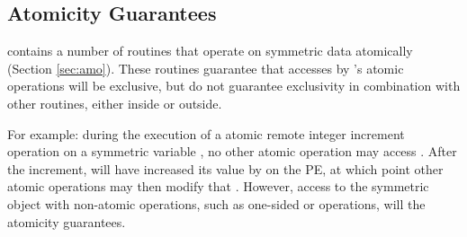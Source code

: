 
\subsection{Atomicity Guarantees}
\label{sec:amo_guarantees}
\openshmem contains a number of routines that operate on symmetric data
atomically (Section \ref{sec:amo}).  These routines guarantee that accesses by \openshmem's
atomic operations will be exclusive, but do not guarantee exclusivity
in combination with other routines, either inside \openshmem or
outside.

For example: during the execution of a atomic remote integer increment
operation on a symmetric variable , no other \openshmem atomic
operation may access .  After the increment,  will have
increased its value by  on the \target{} \ac{PE}, at which point other
atomic operations may then modify that .
However, access to the symmetric
object  with non-atomic operations, such as one-sided \PUT{} or \GET{} operations,
 will  the atomicity guarantees.

